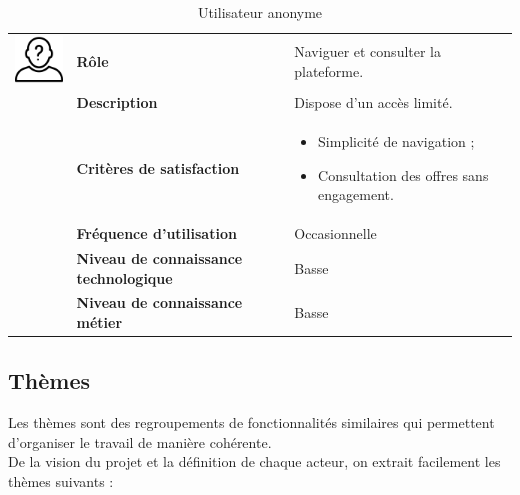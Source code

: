 \documentclass[12pt]{report}
\begin{document}
				\begin{longtable}{|p{3cm}|p{4cm}|p{7cm}|}
				  \caption{Utilisateur anonyme}
				  \label{tab:Anon}\\
				  \hline
				\endfirsthead
				\hline
				\endhead
				\begin{minipage}{3cm}
					\includegraphics[width=2cm]{anonyme.png}
				\end{minipage} & \textbf{Rôle} & Naviguer et consulter la plateforme.\\ \cline{2-3}
						& \textbf{Description} & Dispose d’un accès limité. \\ \cline{2-3}
						& \textbf{Critères de satisfaction} & \begin{itemize}
																\item Simplicité de navigation ;
																\item Consultation des offres sans engagement.
															\end{itemize}\\ \cline{2-3}
						& \textbf{Fréquence d’utilisation} & Occasionnelle \\ \cline{2-3}
						& \textbf{Niveau de connaissance technologique} & Basse \\ \cline{2-3}
						& \textbf{Niveau de connaissance métier} & Basse \\ 
				\hline
				\end{longtable}
				\FloatBarrier


				\subsection{Thèmes}
				
				\hspace{15pt} Les thèmes sont des regroupements de fonctionnalités similaires qui permettent d'organiser le travail de manière cohérente.\\
				
				De la vision du projet et la définition de chaque acteur, on extrait facilement les thèmes suivants :
				
\end{document}
